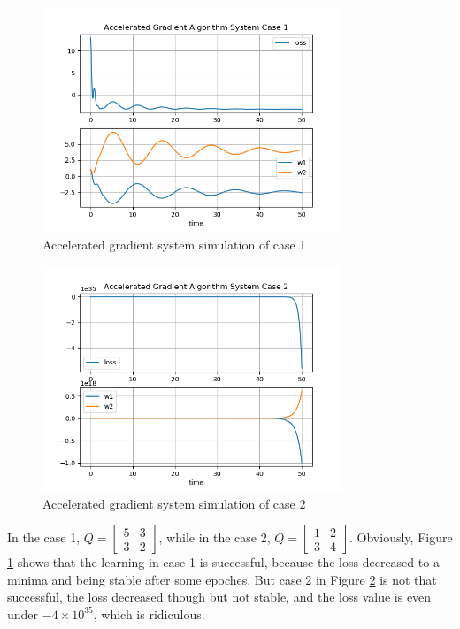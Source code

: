 \documentclass{article}
\begin{document}
\begin{figure}[htbp]
    \centering
    \includegraphics[width=0.8\textwidth]{img/accelerated_gradient_simulation_case_1.png}
    \caption{Accelerated gradient system simulation of case 1}
    \label{fig:gradient_sim_1}
\end{figure}

\begin{figure}[htbp]
    \centering
    \includegraphics[width=0.8\textwidth]{img/accelerated_gradient_simulation_case_2.png}
    \caption{Accelerated gradient system simulation of case 2}
    \label{fig:gradient_sim_2}
\end{figure}

In the case 1, $Q=\begin{bmatrix} 5&3\\3&2 \end{bmatrix}$,
while in the case 2, $Q=\begin{bmatrix} 1&2\\3&4 \end{bmatrix}$.
Obviously, Figure \ref{fig:gradient_sim_1} shows that the learning in case 1 is successful,
because the loss decreased to a minima and being stable after some epoches.
But case 2 in Figure \ref{fig:gradient_sim_2} is not that successful,
the loss decreased though but not stable, and the loss value is even under $-4\times 10^{35}$,
which is ridiculous.
\end{document}
